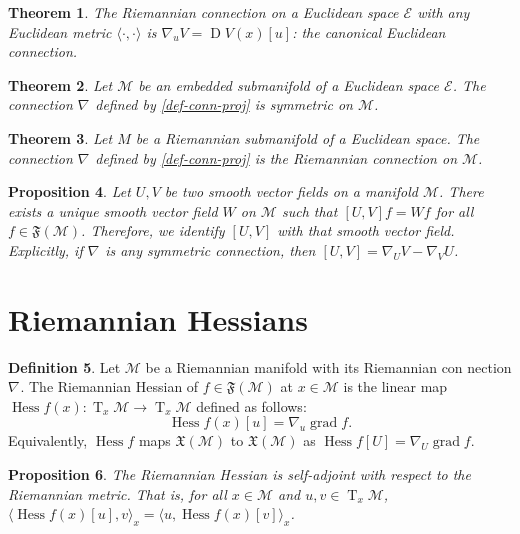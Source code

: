 \documentclass{article}
\theoremstyle{plain}
\newtheorem{theorem}{Theorem}[section]
\newtheorem{proposition}[theorem]{Proposition}
\theoremstyle{definition}
\newtheorem{definition}[theorem]{Definition}
\newcommand{\grad}[2]{\nabla_{#1}{#2}}
\newcommand{\Tang}[2]{\operatorname{T}_{#1}{\mathcal{#2}}}
\newcommand{\VecF}[1]{\mathfrak{X}(\mathcal{#1})}
\newcommand{\SmFunc}[1]{\mathfrak{F}(\mathcal{#1})}
\newcommand{\Conn}[3]{#1\nabla_{#2}{#3}}
\newcommand{\DirDeri}[3]{\operatorname{D}{#1}(#2)[#3]}
\def\calE{\mathcal{E}}
\def\calM{\mathcal{M}}
\begin{document}
\begin{theorem}
The Riemannian connection on a Euclidean space $\calE$ with any Euclidean metric $\langle \cdot, \cdot \rangle$ is $\Conn{}{u}{V} = \DirDeri{V}{x}{u}$: the canonical Euclidean connection.
\end{theorem}

\begin{theorem}
Let $\calM$ be an embedded submanifold of a Euclidean space $\calE$. 
The connection $\Conn{}{}{}$ defined by \ref{def-conn-proj} is symmetric on $\calM$.
\end{theorem}

\begin{theorem}
Let $M$ be a Riemannian submanifold of a Euclidean space. 
The connection $\Conn{}{}{}$ defined by \ref{def-conn-proj} is the Riemannian connection on $\calM$.
\end{theorem}

\begin{proposition}
Let $U,V$ be two smooth vector fields on a manifold $\calM$. 
There exists a unique smooth vector field $W$ on $\calM$ such that $[U,V]f = Wf$ for all $f \in \SmFunc{M}$. 
Therefore, we identify $[U,V]$ with that smooth vector field. 
Explicitly, if $\Conn{}{}{}$ is any symmetric connection, then $[U,V ] = \Conn{}{U}{V} - \Conn{}{V}{U}$.
\end{proposition}

\section{Riemannian Hessians}
\begin{definition}
Let $\calM$ be a Riemannian manifold with its Riemannian con
nection $\Conn{}{}{}$. The Riemannian Hessian of $f\in \SmFunc{M}$ at $x\in \calM$ is the linear map $\operatorname{Hess}f(x): \Tang{x}{M} \to \Tang{x}{M}$ defined as follows: 
$$\operatorname{Hess}f(x)[u] = \grad{u}{\operatorname{grad} f}.$$
Equivalently, $\operatorname{Hess}f$ maps $\VecF{M}$ to $\VecF{M}$ as $\operatorname{Hess}f[U] = \Conn{}{U}{\operatorname{grad} f}$. 
\end{definition}

\begin{proposition}
The Riemannian Hessian is self-adjoint with respect to the
 Riemannian metric. That is, for all $x\in \calM$ and $u, v\in \Tang{x}{M}$, $\langle\operatorname{Hess}f(x)[u], v\rangle_x = \langle u, \operatorname{Hess}f(x)[v]\rangle_x$.
\end{proposition}
\end{document}
